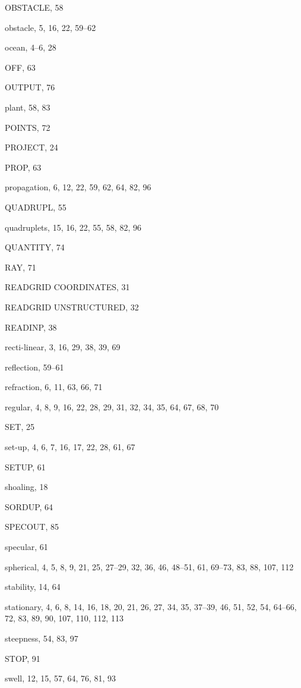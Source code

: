 \documentclass[12pt]{book}
\begin{document}
\begin{theindex}
  \indexspace

  \item OBSTACLE, 58
  \item obstacle, 5, 16, 22, 59--62
  \item ocean, 4--6, 28
  \item OFF, 63
  \item OUTPUT, 76

  \indexspace

  \item plant, 58, 83
  \item POINTS, 72
  \item PROJECT, 24
  \item PROP, 63
  \item propagation, 6, 12, 22, 59, 62, 64, 82, 96

  \indexspace

  \item QUADRUPL, 55
  \item quadruplets, 15, 16, 22, 55, 58, 82, 96
  \item QUANTITY, 74

  \indexspace

  \item RAY, 71
  \item READGRID COORDINATES, 31
  \item READGRID UNSTRUCTURED, 32
  \item READINP, 38
  \item recti-linear, 3, 16, 29, 38, 39, 69
  \item reflection, 59--61
  \item refraction, 6, 11, 63, 66, 71
  \item regular, 4, 8, 9, 16, 22, 28, 29, 31, 32, 34, 35, 64, 67, 68,
		70

  \indexspace

  \item SET, 25
  \item set-up, 4, 6, 7, 16, 17, 22, 28, 61, 67
  \item SETUP, 61
  \item shoaling, 18
  \item SORDUP, 64
  \item SPECOUT, 85
  \item specular, 61
  \item spherical, 4, 5, 8, 9, 21, 25, 27--29, 32, 36, 46, 48--51, 61,
		69--73, 83, 88, 107, 112
  \item stability, 14, 64
  \item stationary, 4, 6, 8, 14, 16, 18, 20, 21, 26, 27, 34, 35, 37--39,
		46, 51, 52, 54, 64--66, 72, 83, 89, 90, 107, 110,
		112, 113
  \item steepness, 54, 83, 97
  \item STOP, 91
  \item swell, 12, 15, 57, 64, 76, 81, 93


\end{theindex}
\end{document}
